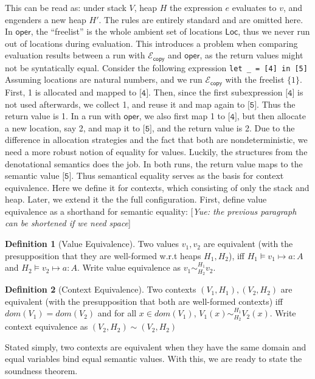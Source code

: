 \documentclass{easychair}
\newcommand{\ms}[1]{\ensuremath{\mathsf{#1}}}
\newcounter{rule}
\newcommand{\veq}[4]{#3 \sim^{#1}_{#2} #4}
\newcommand{\ctxeq}[2]{(#1) \sim (#2)}
\newcommand{\yue}[1]{{\color{blue} [\emph{Yue: #1}]}}
\newcommand{\copySem}{\ensuremath{\mathcal{E}_{\ms{copy}}}}
\theoremstyle{definition}
\newtheorem{definition}{Definition}
\begin{document}
This can be read as: under stack $V$, heap $H$ the expression $e$ evaluates to $v$, 
and engenders a new heap $H'$. The rules are entirely standard and are omitted here.
In $\ms{oper}$, the ``freelist'' is the whole ambient set of locations $\ms{Loc}$, 
thus we never run out of locations during evaluation. This introduces a problem when comparing 
evaluation results between a run with \copySem{} and $\ms{oper}$, as the return values 
might not be syntatically equal. Consider the following expression
\texttt{let \_ = [4] in [5]}
%
Assuming locations are natural numbers, and we run \copySem{} with the freelist $\{1\}$. 
First, 1 is allocated and mapped to $\texttt{[4]}$. 
Then, since the first subexpression $\texttt{[4]}$ is not used afterwards, we collect 1, and reuse it
and map again to $\texttt{[5]}$. Thus the return value is 1.  In a run with $\ms{oper}$, 
we also first map 1 to $\texttt{[4]}$, but then 
allocate a new location, say 2, and map it to $\texttt{[5]}$, and the return value is 2. Due to the 
difference in allocation strategies and the fact that both are nondeterministic, we need a more 
robust notion of equality for values. Luckily, the structures from the denotational semantics 
does the job. In both runs, the return value maps to the semantic value $\texttt{[5]}$.
Thus semantical equality serves as the basis for context equivalence. 
Here we define it for contexts, which consisting of only the stack and heap. 
Later, we extend it the the full configuration. First, define value equivalence as
a shorthand for semantic equality: \yue{the previous paragraph can be shortened if we need space}

\begin{definition}[Value Equivalence]
Two values $v_1,v_2$ are equivalent (with the presupposition that they are well-formed w.r.t heaps $H_1,H_2$),
iff $H_1 \vDash v_1 \mapsto a : A$ and $H_2 \vDash v_2 \mapsto a : A$. 
Write value equivalence as $\veq{H_1}{H_2}{v_1}{v_2}$.
\end{definition}

\begin{definition}[Context Equivalence]
Two contexts $(V_1,H_1), (V_2,H_2)$ are equivalent
(with the presupposition that both are well-formed contexts) iff $dom(V_1) = dom(V_2)$ and 
for all $x \in dom(V_1)$, $\veq{H_1}{H_2}{V_1(x)}{V_2(x)}$. Write context equivalence as 
$\ctxeq{V_2,H_2}{V_2,H_2}$
\end{definition}

Stated simply, two contexts are equivalent when they have the same domain and equal variables bind 
equal semantic values. 
%
With this, we are ready to state the soundness theorem.
\end{document}
